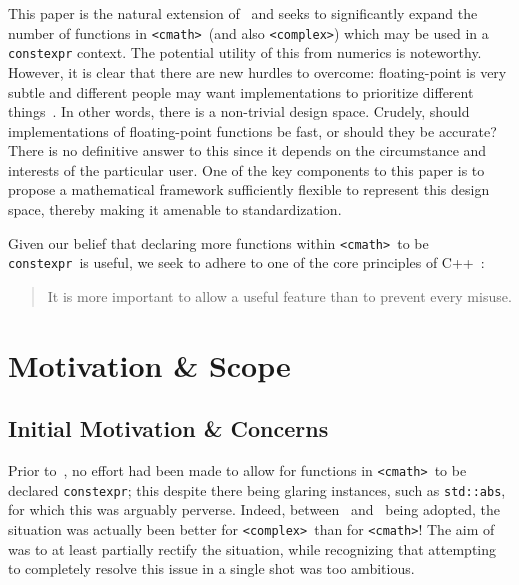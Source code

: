 \documentclass[prd,twocolumn,amsmath,amssymb,nofootinbib,eqsecnum]{revtex4-1}
\newcommand{\constexpr}{\code{constexpr}\xspace}
\newcommand{\code}[1]{{\tt #1}}
\newcommand{\header}[1]{{\tt <#1>}}
\newcommand{\cmath}{\header{cmath}}
\newcommand{\complex}{\header{complex}}
\begin{document}
This paper is the natural extension of~\cite{Rosten-constexpr} and seeks to significantly expand the number of functions in \cmath\ (and also \complex) which may be used in a \constexpr context. The potential utility of this from numerics is noteworthy. However, it is clear that there are new hurdles to overcome: floating-point is very subtle and different people may want implementations to prioritize different things~\cite{Timmons-Less}. In other words, there is a non-trivial design space. Crudely, should implementations of floating-point functions be fast, or should they be accurate? There is no definitive answer to this since it depends on the circumstance and interests of the particular user. One of the key components to this paper is to propose a mathematical framework sufficiently flexible to represent this design space, thereby making it amenable to standardization.

Given our belief that declaring more functions within \cmath\ to be \constexpr\ is useful, we seek to adhere to one of the core principles of C++~\cite{DandE}:
\begin{quote}
	It is more important to allow a useful feature than to prevent every misuse.
\end{quote}

\section{Motivation \& Scope}
\label{sec:Motivation}

\subsection{Initial Motivation \& Concerns}

Prior to~\cite{Rosten-constexpr}, no effort had been made to allow for functions in \cmath\ to be declared \constexpr; this despite there being glaring instances, such as \code{std::abs}, for which this was arguably perverse. Indeed, between~\cite{AP-complex} and~\cite{Rosten-constexpr} being adopted, the situation was actually been better for \complex\ than for \cmath! The aim of~\cite{Rosten-constexpr} was to at least partially rectify the situation, while recognizing that attempting to completely resolve this issue in a single shot was too ambitious.
\end{document}
